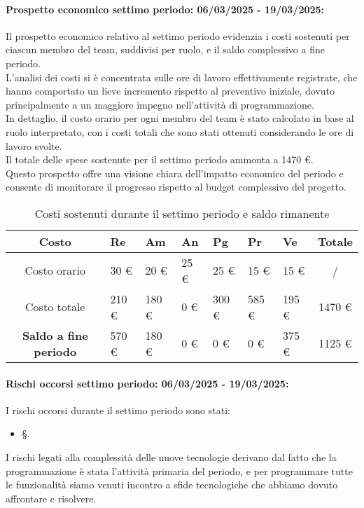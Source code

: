 \paragraph{Prospetto economico settimo periodo: 06/03/2025 - 19/03/2025: }
Il prospetto economico relativo al settimo periodo evidenzia i costi sostenuti per ciascun membro del team, suddivisi per ruolo, e il saldo complessivo a fine periodo.\\
L'analisi dei costi si è concentrata sulle ore di lavoro effettivamente registrate, che hanno comportato un lieve incremento rispetto al preventivo iniziale, dovuto principalmente a un maggiore impegno nell'attività di programmazione.\\
In dettaglio, il costo orario per ogni membro del team è stato calcolato in base al ruolo interpretato, con i costi totali che sono stati ottenuti considerando le ore di lavoro svolte.\\
Il totale delle spese sostenute per il settimo periodo ammonta a 1470 \euro.\\
Questo prospetto offre una visione chiara dell'impatto economico del periodo e consente di monitorare il progresso rispetto al budget complessivo del progetto.
\begin{table}[!h]
    \centering
    \renewcommand{\arraystretch}{1.5}
    \begin{tabularx}{\textwidth}{|c|X|X|X|X|X|X|c|}\hline
    \rowcolor[HTML]{FFD700} 
    \textbf{Costo} & \textbf{Re} & \textbf{Am} & \textbf{An} & \textbf{Pg} & \textbf{Pr} & \textbf{Ve} & \textbf{Totale} \\ \hline
    Costo orario & 30 \euro & 20 \euro & 25 \euro & 25 \euro & 15 \euro & 15 \euro & /  \\ \hline
    Costo totale & 210 \euro & 180 \euro & 0 \euro & 300 \euro & 585 \euro & 195 \euro & 1470 \euro \\ \hline
    \rowcolor[HTML]{FFD700}
    \textbf{Saldo a fine periodo}  & 570 \euro & 180 \euro & 0 \euro & 0 \euro & 0 \euro & 375 \euro & 1125 \euro \\ \hline
    \end{tabularx}
    \caption{Costi sostenuti durante il settimo periodo e saldo rimanente}
\end{table}

\paragraph{Rischi occorsi settimo periodo: 06/03/2025 - 19/03/2025: }
I rischi occorsi durante il settimo periodo sono stati:
\begin{itemize}
    \item \S{}.
\end{itemize}
I rischi legati alla complessità delle nuove tecnologie derivano dal fatto che la programmazione è stata l'attività primaria del periodo, e per programmare tutte le funzionalità siamo venuti incontro a sfide tecnologiche che abbiamo dovuto affrontare e risolvere.


